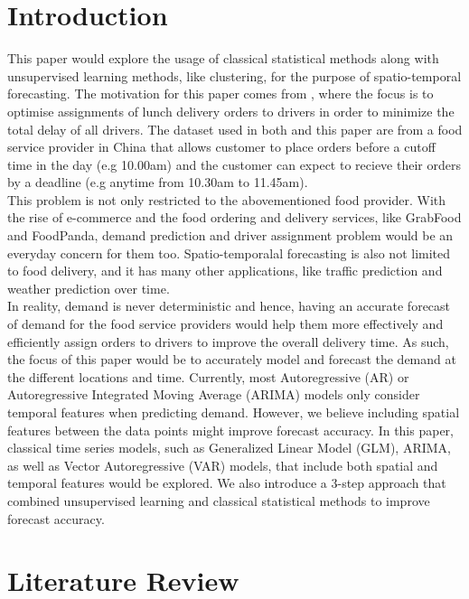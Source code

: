 \documentclass[nonblindrev,msom]{informs3} %
\begin{document}


\section{Introduction}

This paper would explore the usage of classical statistical methods along with unsupervised learning methods, like clustering, for the purpose of spatio-temporal forecasting. The motivation for this paper comes from \cite{Sheng2018}, where the focus is to optimise assignments of lunch delivery orders to drivers in order to minimize the total delay of all drivers. The dataset used in both \cite{Sheng2018} and this paper are from a food service provider in China that allows customer to place orders before a cutoff time in the day (e.g 10.00am) and the customer can expect to recieve their orders by a deadline (e.g anytime from 10.30am to 11.45am). \\

\noindent This problem is not only restricted to the abovementioned food provider. With the rise of e-commerce and the food ordering and delivery services, like GrabFood and FoodPanda, demand prediction and driver assignment problem would be an everyday concern for them too. Spatio-temporalal forecasting is also not limited to food delivery, and it has many other applications, like traffic prediction and weather prediction over time. \\

\noindent In reality, demand is never deterministic and hence, having an accurate forecast of demand for the food service providers would help them more effectively and efficiently assign orders to drivers to improve the overall delivery time. As such, the focus of this paper would be to accurately model and forecast the demand at the different locations and time. Currently, most Autoregressive (AR) or Autoregressive Integrated Moving Average (ARIMA) models only consider temporal features when predicting demand. However, we believe including spatial features between the data points might improve forecast accuracy. In this paper, classical time series models, such as Generalized Linear Model (GLM), ARIMA, as well as Vector Autoregressive (VAR) models, that include both spatial and temporal features would be explored. We also introduce a 3-step approach that combined unsupervised learning and classical statistical methods to improve forecast accuracy. 

\section{Literature Review}
\end{document}
